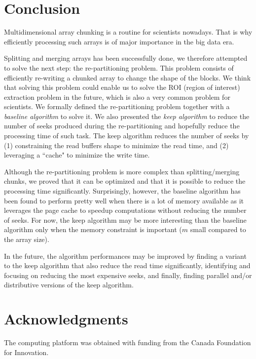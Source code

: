 \documentclass[sigconf, nonacm]{acmart}
\begin{document}
\section{Conclusion}

Multidimensional array chunking is a routine for scientists nowadays.
That is why efficiently processing such arrays is of major importance in the big data era.

Splitting and merging arrays has been successfully done, we therefore attempted
to solve the next step: the re-partitioning problem.
This problem consists of efficiently re-writing a chunked array to change the shape of the blocks.
We think that solving this problem could enable us to solve the ROI (region of interest)
extraction problem in the future, which is also a very common problem for scientists.
We formally defined the re-partitioning problem together with a \emph{baseline algorithm} to solve it.
We also presented the \emph{keep algorithm} to reduce the number of seeks produced during
the re-partitioning and hopefully reduce the processing time of such task.
The keep algorithm reduces the number of seeks by
(1) constraining the read buffers shape to minimize the read time, and
(2) leveraging a ``cache" to minimize the write time.

Although the re-partitioning problem is more complex than splitting/merging chunks,
we proved that it can be optimized and that it is possible to reduce the
processing time significantly.
Surprisingly, however, the baseline algorithm has been found to perform pretty
well when there is a lot of memory available as it leverages the page cache to
speedup computations without reducing the number of seeks.
For now, the keep algorithm may be more interesting than the baseline algorithm
only when the memory constraint is important ($m$ small compared to the array size).

In the future, the algorithm performances may be improved by finding a variant
to the keep algorithm that also reduce the read time significantly,
identifying and focusing on reducing the most expensive seeks,
and finally, finding parallel and/or distributive versions of the keep algorithm.

\section{Acknowledgments}

The computing platform was obtained with funding from the Canada Foundation for Innovation.



\end{document}
